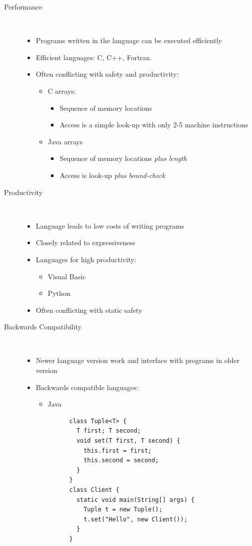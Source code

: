 \begin{description}
\begin{itemize}
  \end{itemize}
 \item[Performance]  $\text{}$
  \begin{itemize}
   \item Programs written in the language can be executed efficiently
   \item Efficient languages: C, C++, Fortran.
   \item Often conflicting with safety and productivity:
    \begin{itemize}
     \item C arrays:
      \begin{itemize}
       \item Sequence of memory locations
       \item Access is a simple look-up with only 2-5 machine instructions
      \end{itemize}
     \item Java arrays
      \begin{itemize}
       \item Sequence of memory locations \emph{plus length}
       \item Access is look-up \emph{plus bound-check}
      \end{itemize}
    \end{itemize}
  \end{itemize}
 \item[Productivity]  $\text{}$
  \begin{itemize}
   \item Language leads to low costs of writing programs
   \item Closely related to expressiveness
   \item Languages for high productivity:
    \begin{itemize}
     \item Visual Basic
     \item Python
    \end{itemize}
   \item Often conflicting with static safety
  \end{itemize}
 \item[Backwards Compatibility]  $\text{}$
  \begin{itemize}
   \item Newer language version work and interface with programs in older version
   \item Backwards compatible languages:
    \begin{itemize}
     \item Java
      \begin{lstlisting}
      class Tuple<T> {
        T first; T second;
        void set(T first, T second) {
          this.first = first;
          this.second = second;
        }
      }
      class Client {
        static void main(String[] args) {
          Tuple t = new Tuple();
          t.set("Hello", new Client());
        }
      }
      \end{lstlisting}


\end{itemize}
\end{itemize}
\end{description}
